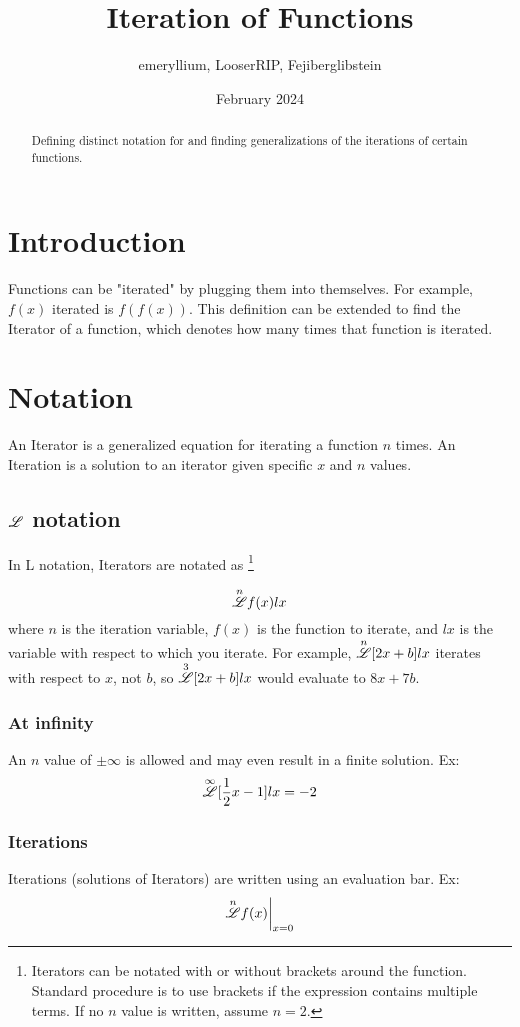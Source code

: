 \documentclass[12pt, letterpaper]{article}
\title{Iteration of Functions}
\author{emeryllium, LooserRIP, Fejiberglibstein}
\date{February 2024}
\begin{document}
\maketitle

\begin{abstract}
    Defining distinct notation for and finding generalizations of the iterations of certain functions.
\end{abstract}

\tableofcontents

\newpage

\section{Introduction}
Functions can be "iterated" by plugging them into themselves. For example, $f(x)$ iterated is $f(f(x))$. This definition can be extended to find the Iterator of a function, which denotes how many times that function is iterated.

\section{Notation}
An Iterator is a generalized equation for iterating a function $n$ times. An Iteration is a solution to an iterator given specific $x$ and $n$ values.

\subsection{$\overset{}{\mathscr{L}}$ notation}
In L notation, Iterators are notated as
    \footnote{Iterators can be notated with or without brackets around the function. Standard procedure is to use brackets if the expression contains multiple terms. If no $n$ value is written, assume $n=2$.}

$$ \overset{n}{\mathscr{L}} f(x) lx$$
where $n$ is the iteration variable, $f(x)$ is the function to iterate, and $lx$ is the variable with respect to which you iterate. For example, $\overset{n}{\mathscr{L}} [2x+b] lx$
iterates with respect to $x$, not $b$, so $\overset{3}{\mathscr{L}} [2x+b] lx$ would evaluate to $8x+7b$.

\subsubsection{At infinity}
An $n$ value of $\pm\infty$ is allowed and may even result in a finite solution. Ex:
$$\overset{\infty}{\mathscr{L}} [\frac{1}{2}x - 1] lx = -2$$

\subsubsection{Iterations}
Iterations (solutions of Iterators) are written using an evaluation bar. Ex:
$$\overset{n}{\mathscr{L}}f(x)\bigg|_{x=0}$$
\end{document}

